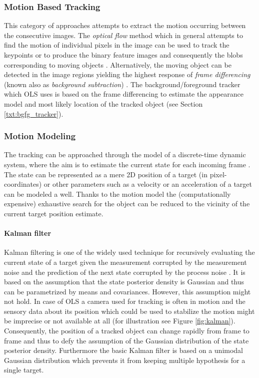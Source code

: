 \subsubsection*{Motion Based Tracking}
This category of approaches attempts to extract the motion occurring between the consecutive images. The \textit{optical flow} method which in general attempts to find the motion of individual pixels in the image can be used to track the keypoints \cite{Bouguet00pyramidalimplementation} or to produce the binary feature images and consequently the blobs corresponding to moving objects \cite{aslani2013optical}. Alternatively, the moving object can be detected in the image regions yielding the highest response of \textit{frame differencing} (known also as \textit{background subtraction}) \cite{Noh2013, Movingobjectdetection}. The background/foreground tracker which OLS uses is based on the frame differencing to estimate the appearance model and most likely location of the tracked object (see Section \ref{txt:bgfg_tracker}).

\subsubsection*{Motion Modeling}
The tracking can be approached through the model of a discrete-time dynamic system, where the aim is to estimate the current state for each incoming frame \cite{Comaniciu:2003:KOT:776753.776799}. The state can be represented as a mere 2D position of a target (in pixel-coordinates) or other parameters such as a velocity or an acceleration of a target can be modeled a well. Thanks to the motion model the (computationally expensive) exhaustive search for the object can be reduced to the vicinity of the current target position estimate.

\paragraph{Kalman filter} 
Kalman filtering is one of the widely used technique for recursively evaluating the current state of a target given the measurement corrupted by the measurement noise and the prediction of the next state corrupted by the process noise \cite{Welch:1995:IKF:897831, cuevas2005kalman}. It is based on the assumption that the state posterior density is Gaussian and thus can be parametrized by means and covariances. However, this assumption might not hold. In case of OLS a camera used for tracking is often in motion and the sensory data about its position which could be used to stabilize the motion might be imprecise or not available at all (for illustration see Figure \ref{fig:kalman}). Consequently, the position of a tracked object can change rapidly from frame to frame and thus to defy the assumption of the Gaussian distribution of the state posterior density. Furthermore the basic Kalman filter is based on a unimodal Gaussian distribution which prevents it from keeping multiple hypothesis for a single target.


